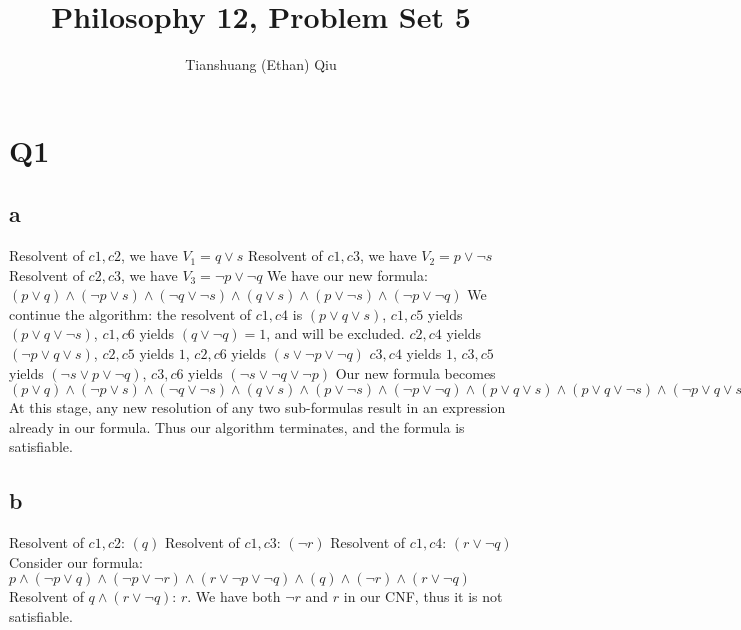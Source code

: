 \documentclass[12pt]{article}
\author{Tianshuang (Ethan) Qiu}
\begin{document}
\title{Philosophy 12, Problem Set 5}
\maketitle

\section{Q1}

\subsection{a}
Resolvent of $c1, c2$, we have $V_1 = q \lor s$
\newline
Resolvent of $c1, c3$, we have $V_2 = p \lor \neg s$
\newline
Resolvent of $c2, c3$, we have $V_3 = \neg p \lor \neg q$
\newline
We have our new formula: $(p \lor q) \land (\neg p \lor s) \land (\neg q \lor \neg s) 
\land (q \lor s) \land (p \lor \neg s) \land (\neg p \lor \neg q)$
\newline
We continue the algorithm: the resolvent of $c1, c4$ is $(p \lor q \lor s)$, $c1, c5$
yields $(p \lor q \lor \neg s)$, $c1, c6$ yields $(q \lor \neg q) = 1$, and will be excluded.
\newline
$c2, c4$ yields $(\neg p \lor q \lor s)$, $c2, c5$ yields $1$, $c2, c6$ yields $(s \lor \neg p \lor \neg q)$
\newline
$c3, c4$ yields $1$, $c3, c5$ yields $(\neg s \lor p \lor \neg q)$, $c3, c6$ yields $(\neg s \lor \neg q \lor \neg p)$
\newline
Our new formula becomes $(p \lor q) \land (\neg p \lor s) \land (\neg q \lor \neg s) 
\land (q \lor s) \land (p \lor \neg s) \land (\neg p \lor \neg q) 
\land (p \lor q \lor s) \land (p \lor q \lor \neg s) \land (\neg p \lor q \lor s)
\land (s \lor \neg p \lor \neg q) \land (\neg p \lor q \lor s) \land (s \lor \neg p \lor \neg q)
\land (\neg s \lor p \lor \neg q) \land (\neg s \lor \neg q \lor \neg p)$
\newline
At this stage, any new resolution of any two sub-formulas result in an expression already 
in our formula. Thus our algorithm terminates, and the formula is satisfiable.

\subsection{b}
Resolvent of $c1, c2$: $(q)$
\newline
Resolvent of $c1, c3$: $(\neg r)$
\newline
Resolvent of $c1, c4$: $(r \lor \neg q)$
\newline
Consider our formula: $p \land (\neg p \lor q) \land (\neg p \lor \neg r) \land (r \lor \neg p \lor \neg q)
\land (q) \land (\neg r) \land (r \lor \neg q)$
\newline
Resolvent of $q \land (r \lor \neg q)$: $r$. We have both $\neg r$ and $r$ in our CNF, 
thus it is not satisfiable.
\end{document}
